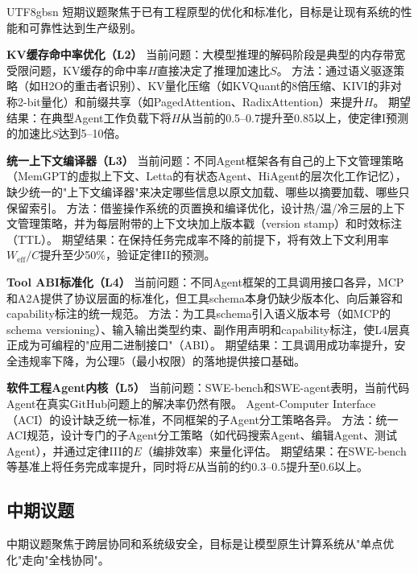 \documentclass[11pt,a4paper]{article}
\begin{document}
\begin{CJK*}{UTF8}{gbsn}
短期议题聚焦于已有工程原型的优化和标准化，目标是让现有系统的性能和可靠性达到生产级别。

\textbf{KV缓存命中率优化（L2）}
当前问题：大模型推理的解码阶段是典型的内存带宽受限问题\cite{gholami2024memorywall}，KV缓存的命中率$H$直接决定了推理加速比$S$。
方法：通过语义驱逐策略（如H2O的重击者识别\cite{h2o2023}）、KV量化压缩（如KVQuant的8倍压缩\cite{hooper2024kvquant}、KIVI的非对称2-bit量化\cite{liu2024kivi}）和前缀共享（如PagedAttention\cite{kwon2023pagedattention}、RadixAttention\cite{sglang2024}）来提升$H$。
期望结果：在典型Agent工作负载下将$H$从当前的0.5--0.7提升至0.85以上，使定律I预测的加速比$S$达到5--10倍。

\textbf{统一上下文编译器（L3）}
当前问题：不同Agent框架各有自己的上下文管理策略（MemGPT的虚拟上下文、Letta的有状态Agent、HiAgent的层次化工作记忆\cite{memgpt2023,letta_stateful_2026,hiagent2024}），缺少统一的"上下文编译器"来决定哪些信息以原文加载、哪些以摘要加载、哪些只保留索引。
方法：借鉴操作系统的页置换和编译优化，设计热/温/冷三层的上下文管理策略，并为每层附带的上下文块加上版本戳（version stamp）和时效标注（TTL）。
期望结果：在保持任务完成率不降的前提下，将有效上下文利用率$W_{\mathrm{eff}}/C$提升至少50\%，验证定律II的预测。

\textbf{Tool ABI标准化（L4）}
当前问题：不同Agent框架的工具调用接口各异，MCP和A2A提供了协议层面的标准化，但工具schema本身仍缺少版本化、向后兼容和capability标注的统一规范\cite{mcp_intro_2026,agentprotocols2025}。
方法：为工具schema引入语义版本号（如MCP的schema versioning）、输入输出类型约束、副作用声明和capability标注，使L4层真正成为可编程的"应用二进制接口"（ABI）。
期望结果：工具调用成功率提升，安全违规率下降，为公理5（最小权限）的落地提供接口基础。

\textbf{软件工程Agent内核（L5）}
当前问题：SWE-bench和SWE-agent表明，当前代码Agent在真实GitHub问题上的解决率仍然有限\cite{swebench2023,sweagent2024}。
Agent-Computer Interface（ACI）的设计缺乏统一标准，不同框架的子Agent分工策略各异。
方法：统一ACI规范，设计专门的子Agent分工策略（如代码搜索Agent、编辑Agent、测试Agent），并通过定律III的$E$（编排效率）来量化评估。
期望结果：在SWE-bench等基准上将任务完成率提升，同时将$E$从当前的约0.3--0.5提升至0.6以上。

\subsection{中期议题}

中期议题聚焦于跨层协同和系统级安全，目标是让模型原生计算系统从"单点优化"走向"全栈协同"。


\end{CJK*}
\end{document}
